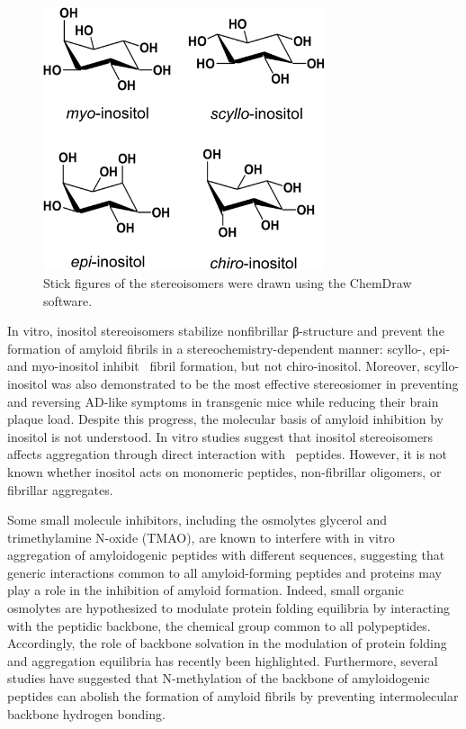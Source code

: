 \begin{figure}[htbp]
  \centering
  \includegraphics[width=3.25in]{figures/results1/GA4_paper_figures_submitted-1}
  \caption[Inositol stereoisomers most commonly found in nature.]
   {Stick figures of the stereoisomers were drawn using the ChemDraw software.}
   \label{fig:figure1}
\end{figure}

In vitro, inositol stereoisomers stabilize nonfibrillar β-structure and prevent the formation of amyloid fibrils in a stereochemistry-dependent manner: scyllo-, epi- and myo-inositol inhibit \abeta\ fibril formation, but not chiro-inositol.\cite{McLaurin:2000p64,McLaurin:1998p176,Nitz:2008p13,Sun:2008p12,Townsend:2006p44} Moreover, scyllo-inositol was also demonstrated to be the most effective stereosiomer in preventing and reversing AD-like symptoms in transgenic mice while reducing their brain plaque load.\cite{McLaurin:2006p29} Despite this progress, the molecular basis of amyloid inhibition by inositol is not understood. In vitro studies suggest that inositol stereoisomers affects aggregation through direct interaction with \abeta\ peptides.\cite{McLaurin:1998p176,McLaurin:2000p64,Nitz:2008p13,Sun:2008p12} However, it is not known whether inositol acts on monomeric peptides, non-fibrillar oligomers, or fibrillar aggregates.

Some small molecule inhibitors, including the osmolytes glycerol and trimethylamine N-oxide (TMAO), are known to interfere with in vitro aggregation of amyloidogenic peptides with different sequences,\cite{Scaramozzino:2006p69,Yang:1999p77,McLaurin:2000p76,Ehrnhoefer:2008p8,Dasilva:2010p25,Bieschke:2010p32} suggesting that generic interactions common to all amyloid-forming peptides and proteins may play a role in the inhibition of amyloid formation. Indeed, small organic osmolytes are hypothesized to modulate protein folding equilibria by interacting with the peptidic backbone, the chemical group common to all polypeptides.\cite{Street:2006p21,Hu:2010p46,Auton:2008p28} Accordingly, the role of backbone solvation in the modulation of protein folding\cite{Rose:2006p35,Auton:2008p28} and aggregation equilibria has recently been highlighted.\cite{Rauscher:2006p43} Furthermore, several studies have suggested that N-methylation of the backbone of amyloidogenic peptides can abolish the formation of amyloid fibrils by preventing intermolecular backbone hydrogen bonding.\cite{Takeda:2010p52,Soto:2007p171}

